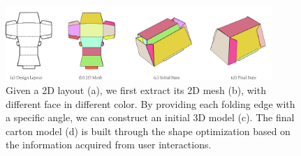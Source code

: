 \begin{figure}
	\centering
	\includegraphics[width=0.9\textwidth]{images/overview.jpg}
	\caption{Given a 2D layout (a), we first extract its 2D mesh (b), with different face in different color. By providing each folding edge with a specific angle, we can construct an initial 3D model (c). The final carton model (d) is built through the shape optimization based on the information acquired from user interactions.}
	\label{fig:overview}
\end{figure} 

